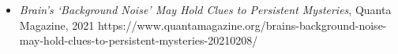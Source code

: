 \begin{itemize}
\tightlist
\item
  \emph{Brain's `Background Noise' May Hold Clues to Persistent
  Mysteries}, Quanta Magazine, 2021
  https://www.quantamagazine.org/brains-background-noise-may-hold-clues-to-persistent-mysteries-20210208/
\end{itemize}
